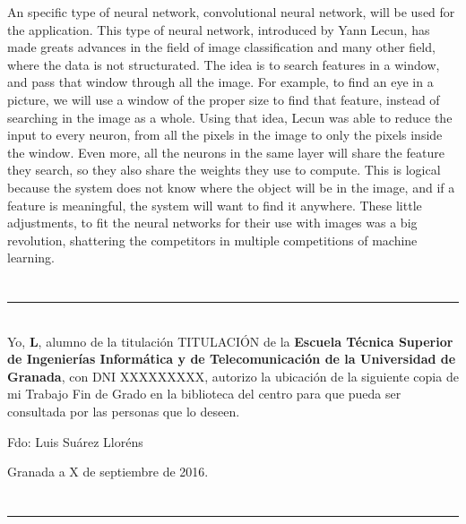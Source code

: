 An specific type of neural network, convolutional neural network, will be used for the application. This type of neural network, introduced by Yann Lecun, has made greats advances in the field of image classification and many other field, where the data is not structurated. The idea is to search features in a window, and pass that window through all the image. For example, to find an eye in a picture, we will use a window of the proper size to find that feature, instead of searching in the image as a whole. Using that idea, Lecun was able to reduce the input to every neuron, from all the pixels in the image to only the pixels inside the window. Even more, all the neurons in the same layer will share the feature they search, so they also share the weights they use to compute. This is logical because the system does not know where the object will be in the image, and if a feature is meaningful, the system will want to find it anywhere. These little adjustments, to fit the neural networks for their use with images was a big revolution, shattering the competitors in multiple competitions of machine learning.
\chapter*{}
\thispagestyle{empty}

\noindent\rule[-1ex]{\textwidth}{2pt}\\[4.5ex]

Yo, \textbf{L}, alumno de la titulación TITULACIÓN de la \textbf{Escuela Técnica Superior
de Ingenierías Informática y de Telecomunicación de la Universidad de Granada}, con DNI XXXXXXXXX, autorizo la
ubicación de la siguiente copia de mi Trabajo Fin de Grado en la biblioteca del centro para que pueda ser
consultada por las personas que lo deseen.

\vspace{6cm}

\noindent Fdo: Luis Suárez Lloréns

\vspace{2cm}

\begin{flushright}
Granada a X de septiembre de 2016.
\end{flushright}


\chapter*{}
\thispagestyle{empty}

\noindent\rule[-1ex]{\textwidth}{2pt}\\[4.5ex]

